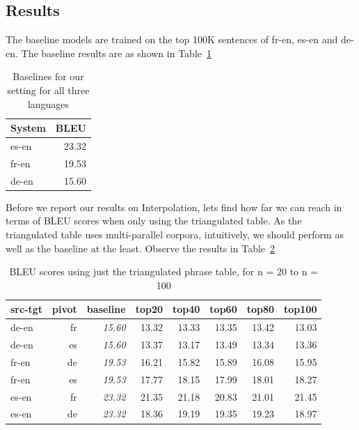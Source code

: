 \subsection{Results}
	The baseline models are trained on the top 100K sentences of fr-en, es-en and de-en. The baseline results are as shown in Table~\ref{table:eparlbaselines}
\begin{table}
	\begin{tabular}{lr}

	\toprule
	System & BLEU \\
	\toprule
	es-en & 23.32 \\
	fr-en & 19.53 \\
	de-en & 15.60 \\
	\bottomrule
	\end{tabular}
	\centering
	\small
	\caption{Baselines for our setting for all three languages}
	\label{table:eparlbaselines}
\end{table}

	Before we report our results on Interpolation, lets find how far we can reach in terms of BLEU scores when only using the triangulated table. As the triangulated table uses multi-parallel corpora, intuitively, we should perform as well as the baseline at the least. Observe the results in Table~\ref{table:eparltopn}

	\begin{table}
	\begin{tabular}{lrrrrrrr}
		\toprule
		src-tgt & pivot & baseline & top20 & top40 & top60 & top80 & top100 \\
		\toprule
		de-en & fr & \emph{15.60} & 13.32 & 13.33 & 13.35 & 13.42 & 13.03 \\
		de-en & es & \emph{15.60} & 13.37 & 13.17 & 13.49 & 13.34 & 13.36 \\
		fr-en & de & \emph{19.53} & 16.21 & 15.82 & 15.89 & 16.08 & 15.95 \\
		fr-en & es & \emph{19.53} & 17.77 & 18.15 & 17.99 & 18.01 & 18.27 \\
		es-en & fr & \emph{23.32} & 21.35 & 21.18 & 20.83 & 21.01 & 21.45\\
		es-en & de & \emph{23.32} & 18.36 & 19.19 & 19.35 & 19.23 & 18.97 \\
		\bottomrule
		\end{tabular}
		\centering 
		\small
		\caption{BLEU scores using just the triangulated phrase table, for n = 20 to n = 100}
		\label{table:eparltopn}
	\end{table}

